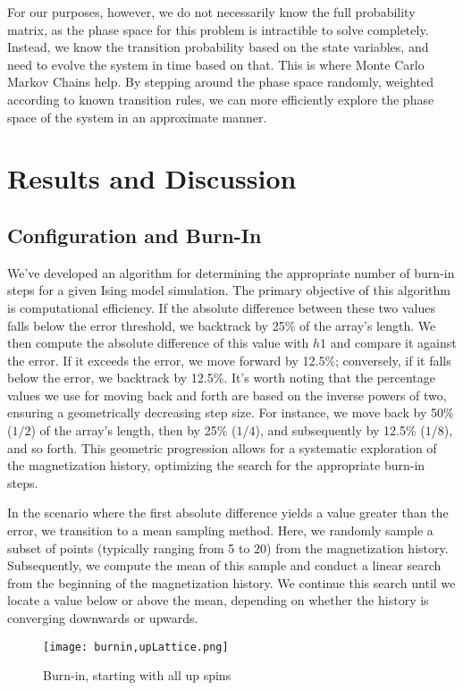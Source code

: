 \documentclass[%
 reprint,
 amsmath,amssymb,
 aps,
]{revtex4-2}
\begin{document}
For our purposes, however, we do not necessarily know the full probability matrix, as the phase space for this problem is intractible to solve completely. Instead, we know the transition probability based on the state variables, and need to evolve the system in time based on that. This is where Monte Carlo Markov Chains help. By stepping around the phase space randomly, weighted according to known transition rules, we can more efficiently explore the phase space of the system in an approximate manner.

\section{\label{sec:level1}Results and Discussion}
\subsection{\label{sec:level2}Configuration and Burn-In}
We've developed an algorithm for determining the appropriate number of burn-in steps for a given Ising model simulation. The primary objective of this algorithm is computational efficiency.
If the absolute difference between these two values falls below the error threshold, we backtrack by 25\% of the array's length. We then compute the absolute difference of this value with \(h1\) and compare it against the error. If it exceeds the error, we move forward by 12.5\%; conversely, if it falls below the error, we backtrack by 12.5\%. It's worth noting that the percentage values we use for moving back and forth are based on the inverse powers of two, ensuring a geometrically decreasing step size. For instance, we move back by 50\% (\(1/2\)) of the array's length, then by 25\% (\(1/4\)), and subsequently by 12.5\% (\(1/8\)), and so forth. This geometric progression allows for a systematic exploration of the magnetization history, optimizing the search for the appropriate burn-in steps.

In the scenario where the first absolute difference yields a value greater than the error, we transition to a mean sampling method. Here, we randomly sample a subset of points (typically ranging from 5 to 20) from the magnetization history. Subsequently, we compute the mean of this sample and conduct a linear search from the beginning of the magnetization history. We continue this search until we locate a value below or above the mean, depending on whether the history is converging downwards or upwards.

\begin{figure}
    \centering
    \texttt{[image: burnin,upLattice.png]}
    \caption{Burn-in, starting with all up spins}
    \label{fig:burnin,upLattice}
\end{figure}
\end{document}
